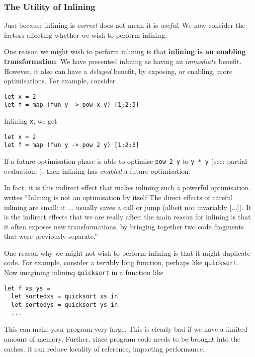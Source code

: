 \subsubsection{The Utility of Inlining}
Just because inlining is \textit{correct} does not mean it is \textit{useful}. We now consider the factors affecting whether we wish to perform inlining. 

One reason we might wish to perform inlining is that \textbf{inlining is an enabling transformation}. We have presented inlining as having an \textit{immediate} benefit. However, it also can have a \textit{delayed} benefit, by exposing, or enabling, more optimisations. For example, consider
\begin{verbatim}
let x = 2
let f = map (fun y -> pow x y) [1;2;3]
\end{verbatim}
Inlining \texttt{x}, we get
\begin{verbatim}
let x = 2
let f = map (fun y -> pow 2 y) [1;2;3]
\end{verbatim}
If a future optimisation phase is able to optimise \texttt{pow 2 y} to \texttt{y * y} (see: partial evaluation, ), then inlining has \textit{enabled} a future optimisation. 

In fact, it is this indirect effect that makes inlining such a powerful optimisation. \citet{peyton-jones-2002} writes ``Inlining is not an optimisation by itself The direct effects of careful inlining are small: it ... usually saves a call or jump (albeit not invariably [...]). It is the indirect effects that we are really after: the main reason for inlining is that it often exposes new transformations, by bringing together two code fragments that were previously separate.''

One reason why we might not wish to perform inlining is that it might duplicate code. For example, consider a terribly long function, perhaps like \texttt{quicksort}. Now imagining inlininq \texttt{quicksort} in a function like
\begin{verbatim}
let f xs ys =
  let sortedxs = quicksort xs in
  let sortedys = quicksort ys in
  ...
\end{verbatim}
This can make your program very large. This is clearly bad if we have a limited amount of memory. Further, since program code needs to be brought into the caches, it can reduce locality of reference, impacting performance.

